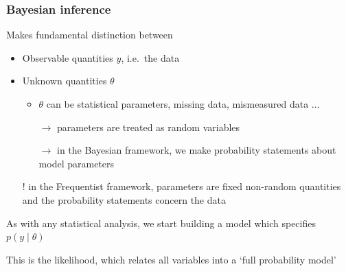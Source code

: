 \begin{frame}[t]

\frametitle{Bayesian inference}

Makes fundamental distinction between
\begin{itemize}
\item Observable quantities $y$, i.e.~the data\vspace{2mm}
\item Unknown quantities $\theta$\vspace{1mm}
\begin{itemize}
\item $\theta$ can be statistical parameters, missing data, mismeasured data $\hdots$\vspace{1mm}
\item[$\rightarrow$] parameters are treated as random variables\vspace{1mm}
\item[$\rightarrow$] in the Bayesian framework, we make probability statements about model parameters\vspace{2mm}
\end{itemize}
\item[!] in the Frequentist framework, parameters are fixed non-random quantities and the probability statements concern the data\vspace{2mm}
\end{itemize}
As with any statistical analysis, we start building a model which specifies $p(y \mid \theta)$\\ \vspace{2mm}

This is the \alert{likelihood}, which relates all variables into a \alert{\lq full probability model'}
\end{frame}






